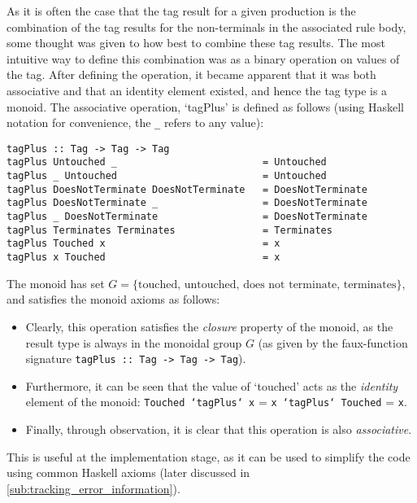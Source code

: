 As it is often the case that the tag result for a given production is the combination of the tag results for the non-terminals in the associated rule body, some thought was given to how best to combine these tag results.
The most intuitive way to define this combination was as a binary operation on values of the tag. 
After defining the operation, it became apparent that it was both associative and that an identity element existed, and hence the tag type is a \gls{monoid}.
The associative operation, `tagPlus' is defined as follows (using Haskell notation for convenience, the \texttt{_} refers to any value):
\begin{verbatim}
tagPlus :: Tag -> Tag -> Tag
tagPlus Untouched _                         = Untouched
tagPlus _ Untouched                         = Untouched
tagPlus DoesNotTerminate DoesNotTerminate   = DoesNotTerminate
tagPlus DoesNotTerminate _                  = DoesNotTerminate
tagPlus _ DoesNotTerminate                  = DoesNotTerminate
tagPlus Terminates Terminates               = Terminates
tagPlus Touched x                           = x
tagPlus x Touched                           = x
\end{verbatim}

The monoid has set $G = \{\text{touched, untouched, does not terminate, terminates}\}$, and satisfies the monoid axioms as follows:
\begin{itemize}
    \item Clearly, this operation satisfies the \textit{closure} property of the monoid, as the result type is always in the monoidal group $G$ (as given by the faux-function signature \texttt{tagPlus :: Tag -> Tag -> Tag}).
    \item Furthermore, it can be seen that the value of `touched' acts as the \textit{identity} element of the monoid: \texttt{Touched `tagPlus` x} = \texttt{x `tagPlus` Touched} = \texttt{x}.
    \item Finally, through observation, it is clear that this operation is also \textit{associative}.
\end{itemize}

This is useful at the implementation stage, as it can be used to simplify the code using common Haskell axioms (later discussed in \autoref{sub:tracking_error_information}). 



